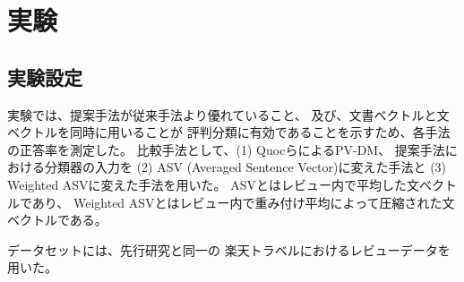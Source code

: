 \documentclass{ttisummary}
\begin{document}
\section{実験}

\subsection{実験設定}

実験では、提案手法が従来手法より優れていること、
及び、文書ベクトルと文ベクトルを同時に用いることが
評判分類に有効であることを示すため、各手法の正答率を測定した。
比較手法として、(1) Quocら\cite{quoc14}によるPV-DM、
提案手法における分類器の入力を
(2) ASV (Averaged Sentence Vector)に変えた手法と
(3) Weighted ASVに変えた手法を用いた。
ASVとはレビュー内で平均した文ベクトルであり、
Weighted ASVとはレビュー内で重み付け平均によって圧縮された文ベクトルである。


データセットには、先行研究\cite{fujitani15}と同一の
楽天トラベルにおけるレビューデータを用いた。


\end{document}
